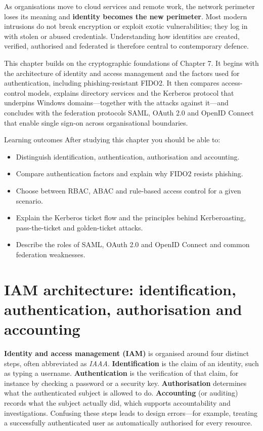 \documentclass[11pt,openany]{book}
\begin{document}
As organisations move to cloud services and remote work, the network perimeter loses its meaning and \textbf{identity becomes the new perimeter}. Most modern intrusions do not break encryption or exploit exotic vulnerabilities; they log in with stolen or abused credentials. Understanding how identities are created, verified, authorised and federated is therefore central to contemporary defence.

This chapter builds on the cryptographic foundations of Chapter 7. It begins with the architecture of identity and access management and the factors used for authentication, including phishing-resistant FIDO2. It then compares access-control models, explains directory services and the Kerberos protocol that underpins Windows domains—together with the attacks against it—and concludes with the federation protocols SAML, OAuth 2.0 and OpenID Connect that enable single sign-on across organisational boundaries.

\begin{outcomesbox}{Learning outcomes}
After studying this chapter you should be able to:
\begin{itemize}
  \item Distinguish identification, authentication, authorisation and accounting.
  \item Compare authentication factors and explain why FIDO2 resists phishing.
  \item Choose between RBAC, ABAC and rule-based access control for a given scenario.
  \item Explain the Kerberos ticket flow and the principles behind Kerberoasting, pass-the-ticket and golden-ticket attacks.
  \item Describe the roles of SAML, OAuth 2.0 and OpenID Connect and common federation weaknesses.
\end{itemize}
\end{outcomesbox}

\section{IAM architecture: identification, authentication, authorisation and accounting}\label{sec:8.1}
\textbf{Identity and access management (IAM)} is organised around four distinct steps, often abbreviated as \emph{IAAA}. \textbf{Identification} is the claim of an identity, such as typing a username. \textbf{Authentication} is the verification of that claim, for instance by checking a password or a security key. \textbf{Authorisation} determines what the authenticated subject is allowed to do. \textbf{Accounting} (or auditing) records what the subject actually did, which supports accountability and investigations. Confusing these steps leads to design errors—for example, treating a successfully authenticated user as automatically authorised for every resource.
\end{document}
